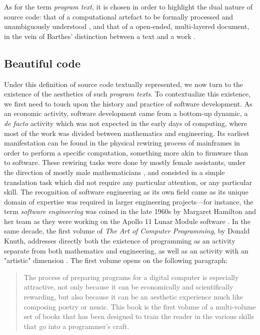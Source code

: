 As for the term \emph{program text}, it is chosen in order to highlight the dual nature of source code: that of a computational artefact to be formally processed and unambiguously understood \citep{detienne_software_2012}, and that of a open-ended, multi-layered document, in the vein of Barthes' distinction between a text and a work \citep{barthes_bruissement_1984}.

\subsection{Beautiful code}

Under this definition of source code textually represented, we now turn to the existence of the aesthetics of such \emph{program texts}. To contextualize this existence, we first need to touch upon the history and practice of software development. As an economic activity, software development came from a bottom-up dynamic, a \emph{de facto} activity which was not expected in the early days of computing, where most of the work was divided between mathematics and engineering. Its earliest manifestation can be found in the physical rewiring process of mainframes in order to perform a specific computation, something more akin to firmware than to software. These rewiring tasks were done by mostly female assistants, under the direction of mostly male mathematicians \citep{chun_software_2005}, and consisted in a simple translation task which did not require any particular attention, or any particular skill. The recognition of software engineering as its own field came as its unique domain of expertise was required in larger engineering projects—for instance, the term \emph{software engineering} was coined in the late 1960s by Margaret Hamilton and her team as they were working on the Apollo 11 Lunar Module software \citep{mindell_digital_2011}. In the same decade, the first volume of \emph{The Art of Computer Programming}, by Donald Knuth, addresses directly both the existence of programming as an activity separate from both mathematics and engineering, as well as an activity with an "artistic" dimension \citep{knuth_art_1997}. The first volume opens on the following paragraph:

\begin{quote}
    The process of preparing programs for a digital computer is especially attractive, not only because it can be economically and scientifically rewarding, but also because it can be an aesthetic experience much like composing poetry or music. This book is the first volume of a multi-volume set of books that has been designed to train the reader in the various skills that go into a programmer's craft. \citep{knuth_art_1997}
\end{quote}

